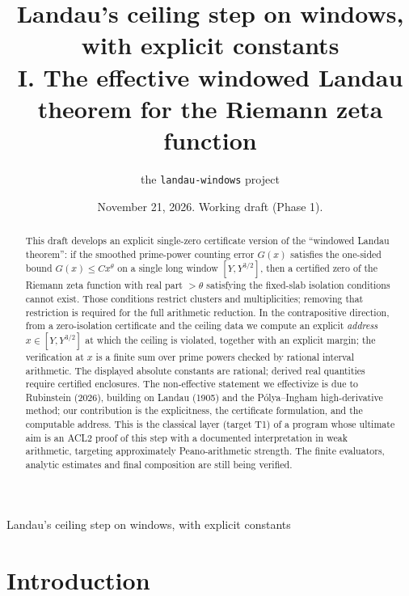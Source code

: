 \documentclass[11pt]{amsart}
\numberwithin{equation}{section}
\begin{document}
\title{Landau's ceiling step on windows, with explicit constants\\
\large I. The effective windowed Landau theorem for the Riemann zeta function}

\author{the \texttt{landau-windows} project}

\date{November 21, 2026. Working draft (Phase 1).}

\begin{abstract}
This draft develops an explicit single-zero certificate version of the
``windowed Landau theorem'': if the smoothed prime-power counting error $G(x)$ satisfies
the one-sided bound $G(x) \le C x^{\theta}$ on a single long window
$[Y, Y^{3/2}]$, then a certified zero of the Riemann zeta function with
real part $>\theta$ satisfying the fixed-slab isolation conditions cannot
exist. Those conditions restrict clusters and multiplicities; removing
that restriction is required for the full arithmetic reduction. In the
contrapositive direction, from a zero-isolation
certificate and the ceiling data we compute an explicit \emph{address}
$x \in [Y, Y^{3/2}]$ at which the ceiling is violated, together with an
explicit margin; the verification at $x$ is a finite sum over prime powers
checked by rational interval arithmetic. The displayed absolute constants
are rational; derived real quantities require certified enclosures.
The non-effective statement we
effectivize is due to Rubinstein (2026), building on Landau (1905) and the
P\'olya--Ingham high-derivative method; our contribution is the
explicitness, the certificate formulation, and the computable address. This
is the classical layer (target T1) of a program whose ultimate aim is an
ACL2 proof of this step with a documented interpretation in weak arithmetic,
targeting approximately Peano-arithmetic strength. The finite evaluators,
analytic estimates and final composition are still being verified.
\end{abstract}

\maketitle

\pagestyle{myheadings}
%
        {Landau's ceiling step on windows, with explicit constants}

\tableofcontents

\section{Introduction}\label{sec:intro}
\end{document}
